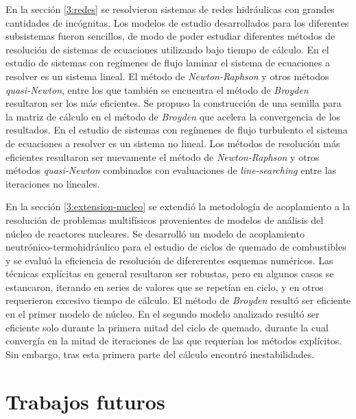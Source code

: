 En la sección \ref{3:redes} se resolvieron sistemas de redes hidráulicas con grandes cantidades de incógnitas.
Los modelos de estudio desarrollados para los diferentes subsistemas fueron sencillos,
de modo de poder estudiar diferentes métodos de resolución de sistemas de ecuaciones utilizando bajo tiempo de cálculo.
En el estudio de sistemas con regímenes de flujo laminar el sistema de ecuaciones a resolver es un sistema lineal.
El método de \textit{Newton-Raphson} y otros métodos \textit{quasi-Newton}, entre los que también se encuentra el método de \textit{Broyden} resultaron ser los más eficientes.
Se propuso la construcción de una semilla para la matriz de cálculo en el método de \textit{Broyden} que acelera la convergencia de los resultados.
En el estudio de sistemas con regímenes de flujo turbulento el sistema de ecuaciones a resolver es un sistema no lineal.
Los métodos de resolución más eficientes resultaron ser nuevamente el método de \textit{Newton-Raphson} y otros métodos \textit{quasi-Newton}
combinados con evaluaciones de \textit{line-searching} entre las iteraciones no lineales.

En la sección \ref{3:extension-nucleo} se extendió la metodología de acoplamiento a la resolución de problemas multifísicos provenientes de modelos de análisis del núcleo de reactores nucleares.
Se desarrolló un modelo de acoplamiento neutrónico-termohidráulico para el estudio de ciclos de quemado de combustibles y se evaluó la eficiencia de resolución de difererentes esquemas numéricos.
Las técnicas explícitas en general resultaron ser robustas, pero en algunos casos se estancaron, iterando en series de valores que se repetían en ciclo,
y en otros requerieron excesivo tiempo de cálculo.
El método de \textit{Broyden} resultó ser eficiente en el primer modelo de núcleo.
En el segundo modelo analizado resultó ser eficiente solo durante la primera mitad del ciclo de quemado,
durante la cual convergía en la mitad de iteraciones de las que requerían los métodos explícitos.
Sin embargo, tras esta primera parte del cálculo encontró inestabilidades.


\section{Trabajos futuros}
\label{trabajos-futuros}


